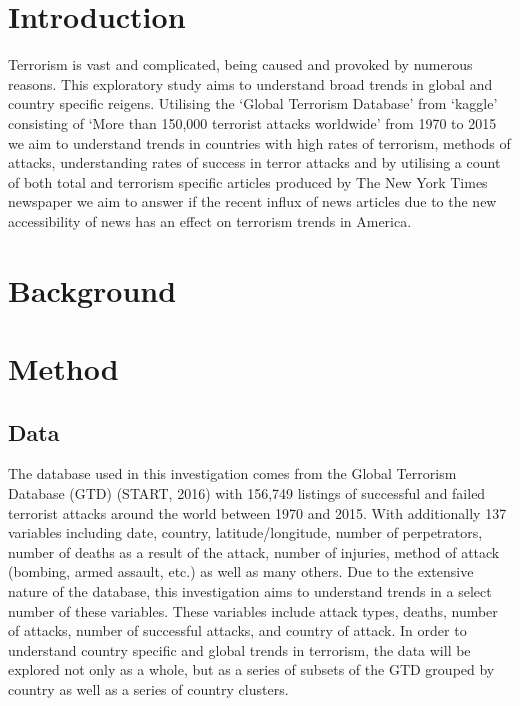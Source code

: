 \documentclass[10pt,a4paper]{article}
\begin{document}
\section{Introduction} 
Terrorism is vast and complicated, being caused and provoked by numerous reasons.  This exploratory study aims to understand broad trends in global and country specific reigens. Utilising the ‘Global Terrorism Database’ from ‘kaggle’ consisting of ‘More than 150,000 terrorist attacks worldwide’ from 1970 to 2015 we aim to understand trends in countries with high rates of terrorism, methods of attacks, understanding rates of success in terror attacks and by utilising a count of both total and terrorism specific  articles produced by The New York Times newspaper we aim to answer if the recent influx of news articles due to the new accessibility of news has an effect on terrorism trends in America.

\section{Background} 

\section{Method}
\subsection{Data}
The database used in this investigation comes from the Global Terrorism Database (GTD) (START, 2016) with 156,749 listings of successful and failed terrorist attacks around the world between 1970 and 2015. With additionally 137 variables including date, country, latitude/longitude, number of perpetrators, number of deaths as a result of the attack, number of injuries, method of attack (bombing, armed assault, etc.) as well as many others. Due to the extensive nature of the database, this investigation aims to understand trends in a select number of these variables. These variables include attack types, deaths, number of attacks, number of successful attacks, and country of attack. In order to understand country specific and global trends in terrorism, the data will be explored not only as a whole, but as a series of subsets of the GTD grouped by country as well as a series of country clusters.
\\\\
\end{document}
